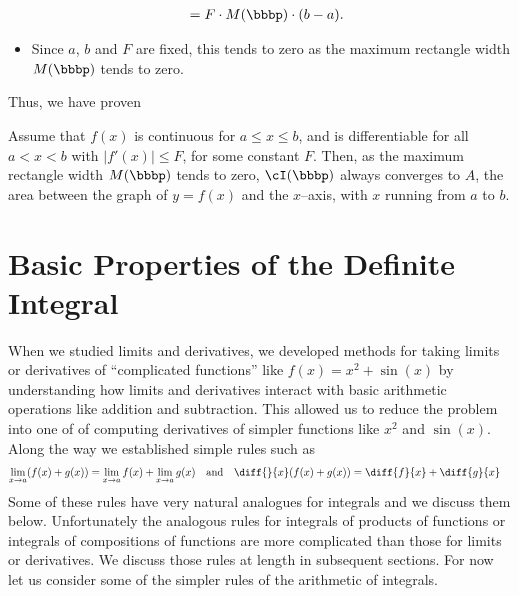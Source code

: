 \begin{itemize}
\begin{align*}
  & = F\cdot M(\bbbp)\cdot (b-a).
\end{align*}
\item Since $a$, $b$ and $F$ are fixed, this tends to zero as the maximum
rectangle
width $M(\bbbp)$ tends to zero.
\end{itemize}

Thus, we have proven
\begin{theorem}
Assume that $f(x)$ is continuous for $a\le x\le b$, and
is differentiable for all $a<x<b$ with $|f'(x)|\le F$, for some
constant $F$.  Then,
as the maximum rectangle width $M(\bbbp)$ tends to zero,
$\cI(\bbbp)$ always converges to $A$, the area
between the graph of $y=f(x)$ and the $x$--axis,
with $x$ running from $a$ to $b$.
\end{theorem}

\vspace{1in}

\section{Basic Properties of the Definite Integral}
When we studied limits and derivatives, we developed methods for taking limits
or derivatives of ``complicated functions'' like $f(x)=x^2 + \sin(x)$ by
understanding how limits and derivatives interact with basic arithmetic
operations like addition and subtraction. This allowed us to reduce the problem
into one of of computing derivatives of simpler functions like $x^2$ and
$\sin(x)$. Along the way we established
simple rules such as
\begin{align*}
  \lim_{x\to a}(f(x)+g(x)) &= \lim_{x\to a}f(x) + \lim_{x\to a} g(x)
&\text{and}&&
  \diff{}{x}(f(x)+g(x)) &= \diff{f}{x} + \diff{g}{x}
\end{align*}
Some of these rules have very natural analogues for integrals and we discuss
them below. Unfortunately the analogous rules for integrals of products of
functions or integrals of compositions of functions are more complicated than
those for limits or derivatives. We discuss those rules at length in subsequent
sections. For now let us consider some of the simpler rules of the arithmetic
of
integrals.


